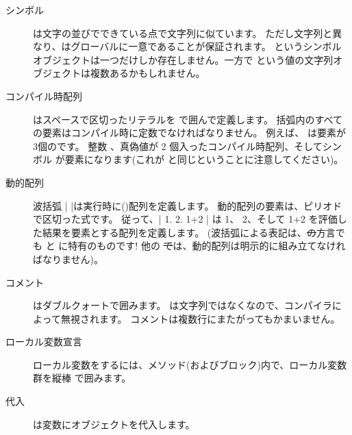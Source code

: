 \documentclass[a4paper,10pt,twoside]{book}
\begin{document}
\begin{description}
\item[シンボル] は文字の並びでできている点で文字列に似ています。
	ただし文字列と異なり、はグローバルに一意であることが保証されます。
		 というシンボルオブジェクトは一つだけしか存在しません。一方で  という値の文字列オブジェクトは複数あるかもしれません。

\item[コンパイル時配列] はスペースで区切ったリテラルを \ct{#( )} で囲んで定義します。
		括弧内のすべての要素はコンパイル時に定数でなければなりません。
		例えば、 は要素が 3個のです。 整数 、真偽値が 2 個入ったコンパイル時配列、そしてシンボル  が要素になります(これが  と同じということに注意してください)。

\item[動的配列] 波括弧 \ct|{ }|は実行時に()配列を定義します。
		動的配列の要素は、ピリオドで区切った式です。
		従って、\ct|{ 1. 2. 1+2 }| は 1、 2、そして 1+2 を評価した結果を要素とする配列を定義します。
		(波括弧による表記は、\st の方言でも \pharo と \squeak に特有のものです!
		他の \st では、動的配列は明示的に組み立てなければなりません)。

\item[コメント] はダブルクォートで囲みます。
		 は文字列ではなくなので、\pharo コンパイラによって無視されます。
		コメントは複数行にまたがってもかまいません。
		
\item[ローカル変数宣言] ローカル変数をするには、メソッド(およびブロック)内で、ローカル変数群を縦棒 \ct{| |} で囲みます。

\item[代入] \ct{:=} は変数にオブジェクトを代入します。


\end{description}
\end{document}
